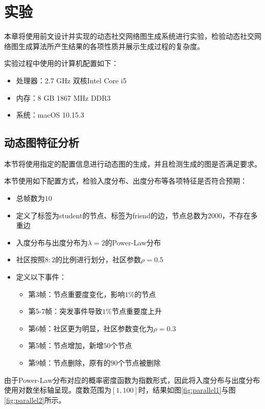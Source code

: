 
\chapter{实验}
\label{cha:chapter05}

本章将使用前文设计并实现的动态社交网络图生成系统进行实验，检验动态社交网络图生成算法所产生结果的各项性质并展示生成过程的复杂度。

实验过程中使用的计算机配置如下：

\begin{itemize}
  \item 处理器：2.7 GHz 双核Intel Core i5
  \item 内存：8 GB 1867 MHz DDR3
  \item 系统：macOS 10.15.3
\end{itemize}

\section{动态图特征分析}

本节将使用指定的配置信息进行动态图的生成，并且检测生成的图是否满足要求。

本节使用如下配置方式，检验入度分布、出度分布等各项特征是否符合预期：

\begin{itemize}
  \item 总帧数为$10$
  \item 定义了标签为student的节点、标签为friend的边，节点总数为$2000$，不存在多重边
  \item 入度分布与出度分布为$\lambda=2$的Power-Law分布
  \item 社区按照$8:2$的比例进行划分，社区参数$\rho=0.5$
  \item 定义以下事件：
  \begin{itemize}
    \item 第3帧：节点重要度变化，影响$1\%$的节点
    \item 第5-7帧：突发事件导致$1\%$节点重要度上升
    \item 第6帧：社区更为明显，社区参数变化为$\rho=0.3$
    \item 第5帧：节点增加，新增$50$个节点
    \item 第9帧：节点删除，原有的$90$个节点被删除
  \end{itemize}
\end{itemize}

由于Power-Law分布对应的概率密度函数为指数形式，因此将入度分布与出度分布使用对数坐标轴呈现。度数范围为$[1, 100]$时，结果如图\ref{fig:parallel1}与图\ref{fig:parallel2}所示。

